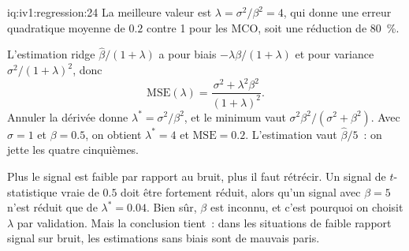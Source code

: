 \begin{solution}{iq:iv1:regression:24}
La meilleure valeur est $\lambda = \sigma^2/\beta^2 = 4$, qui donne une erreur quadratique moyenne de $0.2$ contre 1 pour les MCO, soit une réduction de 80~\%.

L'estimation ridge $\hat\beta/(1 + \lambda)$ a pour biais $-\lambda\beta/(1 + \lambda)$ et pour variance $\sigma^2/(1 + \lambda)^2$, donc
\[
\mathrm{MSE}(\lambda) = \frac{\sigma^2 + \lambda^2\beta^2}{(1 + \lambda)^2}.
\]
Annuler la dérivée donne $\lambda^* = \sigma^2/\beta^2$, et le minimum vaut $\sigma^2\beta^2/(\sigma^2 + \beta^2)$. Avec $\sigma = 1$ et $\beta = 0.5$, on obtient $\lambda^* = 4$ et $\mathrm{MSE} = 0.2$. L'estimation vaut $\hat\beta/5$~: on jette les quatre cinquièmes.

Plus le signal est faible par rapport au bruit, plus il faut rétrécir. Un signal de $t$-statistique vraie de $0.5$ doit être fortement réduit, alors qu'un signal avec $\beta = 5$ n'est réduit que de $\lambda^* = 0.04$. Bien sûr, $\beta$ est inconnu, et c'est pourquoi on choisit $\lambda$ par validation. Mais la conclusion tient~: dans les situations de faible rapport signal sur bruit, les estimations sans biais sont de mauvais paris.

\end{solution}

